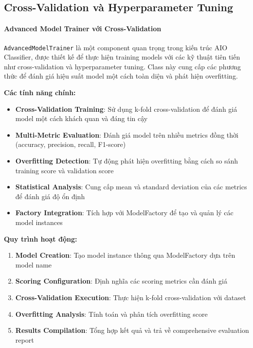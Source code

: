 \subsection{Cross-Validation và Hyperparameter Tuning}

\paragraph{Advanced Model Trainer với Cross-Validation}

\texttt{AdvancedModelTrainer} là một component quan trọng trong kiến trúc AIO Classifier, được thiết kế để thực hiện training models với các kỹ thuật tiên tiến như cross-validation và hyperparameter tuning. Class này cung cấp các phương thức để đánh giá hiệu suất model một cách toàn diện và phát hiện overfitting.

\textbf{Các tính năng chính:}

\begin{itemize}
    \item \textbf{Cross-Validation Training}: Sử dụng k-fold cross-validation để đánh giá model một cách khách quan và đáng tin cậy
    \item \textbf{Multi-Metric Evaluation}: Đánh giá model trên nhiều metrics đồng thời (accuracy, precision, recall, F1-score)
    \item \textbf{Overfitting Detection}: Tự động phát hiện overfitting bằng cách so sánh training score và validation score
    \item \textbf{Statistical Analysis}: Cung cấp mean và standard deviation của các metrics để đánh giá độ ổn định
    \item \textbf{Factory Integration}: Tích hợp với ModelFactory để tạo và quản lý các model instances
\end{itemize}

\textbf{Quy trình hoạt động:}

\begin{enumerate}
    \item \textbf{Model Creation}: Tạo model instance thông qua ModelFactory dựa trên model name
    \item \textbf{Scoring Configuration}: Định nghĩa các scoring metrics cần đánh giá
    \item \textbf{Cross-Validation Execution}: Thực hiện k-fold cross-validation với dataset
    \item \textbf{Overfitting Analysis}: Tính toán và phân tích overfitting score
    \item \textbf{Results Compilation}: Tổng hợp kết quả và trả về comprehensive evaluation report
\end{enumerate}

